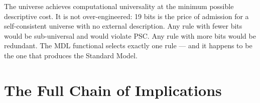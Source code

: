 \documentclass[11pt,a4paper]{article}
\begin{document}
\begin{tcolorbox}[colback=boxblue,colframe=blue!40!black,title=The key insight]
The universe achieves computational universality at the minimum possible descriptive
cost.  It is not over-engineered: 19 bits is the price of admission for a
self-consistent universe with no external description.  Any rule with fewer bits would
be sub-universal and would violate PSC.  Any rule with more bits would be redundant.
The MDL functional selects exactly one rule — and it happens to be the one that
produces the Standard Model.
\end{tcolorbox}

\section{The Full Chain of Implications}
\end{document}
